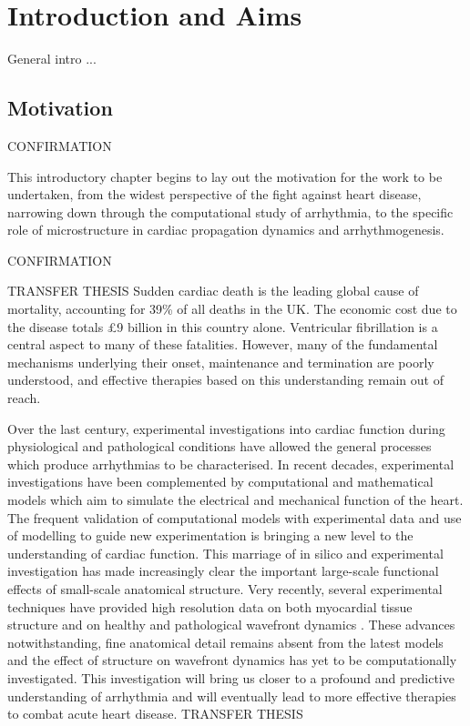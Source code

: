 \chapter{Introduction and Aims}
\dblspace

General intro ...

\section{Motivation}
\label{sec:intro:motivation}
CONFIRMATION

      This introductory chapter begins to lay out the motivation for the work to be undertaken, from the widest perspective of the fight against heart disease, narrowing down through the computational study of arrhythmia, to the specific role of microstructure in cardiac propagation dynamics and arrhythmogenesis.
      
CONFIRMATION

TRANSFER THESIS
  Sudden cardiac death is the leading global cause of mortality, accounting for 39\% of all deaths in the UK. The economic cost due to the disease totals \pounds9 billion in this country alone. Ventricular fibrillation is a central aspect to many of these fatalities. However, many of the fundamental mechanisms underlying their onset, maintenance and termination are poorly understood, and effective therapies based on this understanding remain out of reach.
  
  Over the last century, experimental investigations into cardiac function during physiological and pathological conditions have allowed the general processes which produce arrhythmias to be characterised. In recent decades, experimental investigations have been complemented by computational and mathematical models which aim to simulate the electrical and mechanical function of the heart. The frequent validation of computational models with experimental data and use of modelling to guide new experimentation is bringing a new level to the understanding of cardiac function. This marriage of in silico and experimental investigation has made increasingly clear the important large-scale functional effects of small-scale anatomical structure. Very recently, several experimental techniques have provided high resolution data on both myocardial tissue structure and on healthy and pathological wavefront dynamics \cite{Burton:2006p100,Plank:2009p440,Bishop:2009p940}. These advances notwithstanding, fine anatomical detail remains absent from the latest models and the effect of structure on wavefront dynamics has yet to be computationally investigated. This investigation will bring us closer to a profound and predictive understanding of arrhythmia and will eventually lead to more effective therapies to combat acute heart disease.
TRANSFER THESIS

